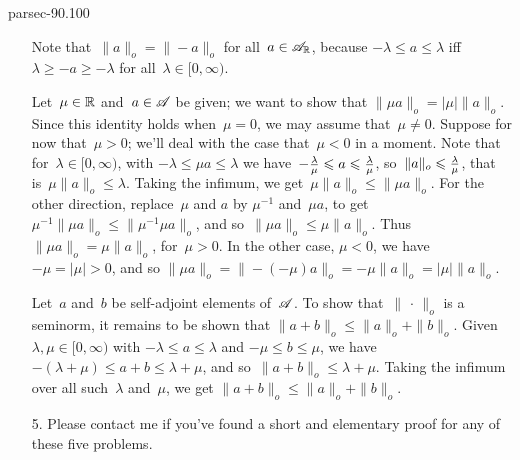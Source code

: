 \documentclass[b5page]{book}
\begin{document}
\begin{solution}{parsec-90.100}
\begin{enumerate}
Note that~$\|a\|_o = \|-a\|_o$
for all~$a\in\Real\scrA$,
because $-\lambda \leq a\leq \lambda$
iff $\lambda\geq -a \geq -\lambda$
for all~$\lambda\in[0,\infty)$.

Let~$\mu\in\R$ and~$a\in\scrA$ be given;
we want to show that $\|\mu a \|_o = \left|\mu\right|\|a\|_o$.
Since this identity holds when~$\mu=0$,
we may assume that~$\mu\neq 0$.
Suppose for now that~$\mu>0$;
we'll deal with the case that~$\mu<0$ in a moment.
Note that for~$\lambda\in [0,\infty)$,
with $-\lambda \leq \mu a \leq \lambda$
we have~$-\smash{\frac{\lambda}{\mu}}\leq a \leq \smash{\frac{\lambda}{\mu}} $,
so~$\|a\|_o\leq \smash{\frac{\lambda}{\mu}}$,
that is~$\mu \|a\|_o \leq \lambda$.
Taking the infimum, we get~$\mu \|a\|_o\leq \|\mu a\|_o$.
For the other direction,
replace~$\mu$ and $a$ by $\mu^{-1}$ and~$\mu a$,
to get $\mu^{-1} \|\mu a\|_o \leq \|\mu^{-1} \mu a\|_o$,
and so~$\|\mu a\|_o \leq \mu \|a\|_o$.
Thus~$\|\mu a\|_o = \mu\|a\|_o$,
for~$\mu>0$.
In the other case, $\mu<0$,
we have~$-\mu=\left|\mu\right| >0$, 
and so $\|\mu a\|_o = \|-(-\mu)a\|_o
= -\mu \|a\|_o = \left|\mu\right|\|a\|_o$.

Let~$a$ and~$b$ be self-adjoint elements of~$\scrA$.
To show that~$\|\,\cdot\,\|_o$ is a seminorm,
it remains to be shown that
$\|a+b\|_o\leq \|a\|_o+\|b\|_o$.
Given~$\lambda,\mu\in [0,\infty)$
with $-\lambda \leq a\leq \lambda$
and $-\mu \leq b\leq \mu$,
we have $-(\lambda+\mu)\leq a+b\leq \lambda+\mu$,
and so~$\|a+b\|_o\leq \lambda+\mu$.
Taking the infimum over all such~$\lambda$ and~$\mu$,
we get $\|a+b\|_o\leq \|a\|_o + \|b\|_o$.

\item[5.]
Please contact me if you've found a short and elementary proof for any of these
five problems.
\end{enumerate}
\end{solution}
\end{document}

